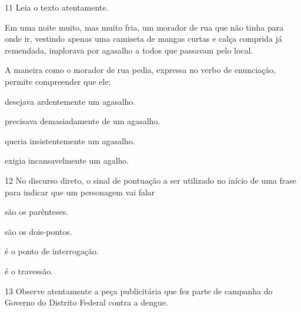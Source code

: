 \num{11} Leia o texto atentamente.

\begin{myquote}
Em uma noite muito, mas muito fria, um morador de rua que não tinha para
onde ir, vestindo apenas uma camiseta de mangas curtas e calça comprida
já remendada, implorava por agasalho a todos que passavam pelo local.

\end{myquote}

A maneira como o morador de rua pedia, expressa no verbo de enunciação,
permite compreender que ele:

\begin{escolha}
\item desejava ardentemente um agasalho.

\item precisava demasiadamente de um agasalho.

\item queria insistentemente um agasalho.

\item exigia incansavelmente um agalho.
\end{escolha}

\num{12} No discurso direto, o sinal de pontuação a ser utilizado no início
de uma frase para indicar que um personagem vai falar

\begin{escolha}
\item são os parênteses.

\item são os dois-pontos.

\item é o ponto de interrogação.

\item é o travessão.
\end{escolha}

\pagebreak
\num{13} Observe atentamente a peça publicitária que fez parte de campanha do
Governo do Distrito Federal contra a dengue.

